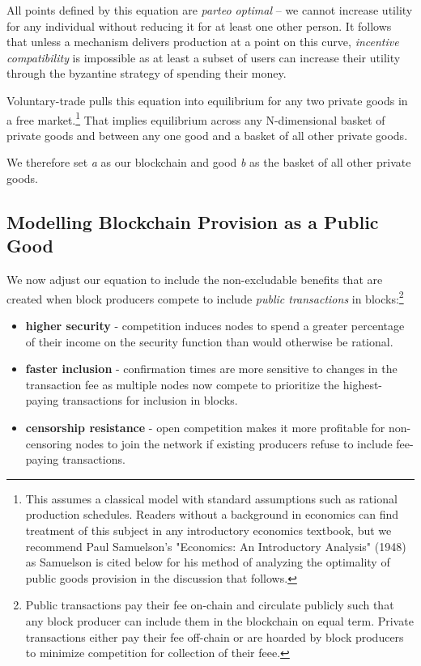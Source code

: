 \documentclass[oneside]{article}   	%
\begin{document}
All points defined by this equation are \textit{parteo optimal} -- we cannot increase utility for any individual without reducing it for at least one other person. It follows that unless a mechanism delivers production at a point on this curve, \textit{incentive compatibility} is impossible as at least a subset of users can increase their utility through the byzantine strategy of spending their money.

Voluntary-trade pulls this equation into equilibrium for any two private goods in a free market.\footnote{This assumes a classical model with standard assumptions such as rational production schedules. Readers without a background in economics can find treatment of this subject in any introductory economics textbook, but we recommend Paul Samuelson's "Economics: An Introductory Analysis" (1948) as Samuelson is cited below for his method of analyzing the optimality of public goods provision in the discussion that follows.} That implies equilibrium across any N-dimensional basket of private goods and between any one good and a basket of all other private goods.

We therefore set \textit{a} as our blockchain and good \textit{b} as the basket of all other private goods.

\subsection*{Modelling Blockchain Provision as a Public Good}

We now adjust our equation to include the non-excludable benefits that are created when block producers compete to include \textit{public transactions} in blocks:\footnote{Public transactions pay their fee on-chain and circulate publicly such that any block producer can include them in the blockchain on equal term. Private transactions either pay their fee off-chain or are hoarded by block producers to minimize competition for collection of their feee.}

\begin{itemize}
  \item \textbf{higher security} - competition induces nodes to spend a greater percentage of their income on the security function than would otherwise be rational.
  \item \textbf{faster inclusion} - confirmation times are more sensitive to changes in the transaction fee as multiple nodes now compete to prioritize the highest-paying transactions for inclusion in blocks.
  \item \textbf{censorship resistance} - open competition makes it more profitable for non-censoring nodes to join the network if existing producers refuse to include fee-paying transactions.
\end{itemize}
\end{document}
